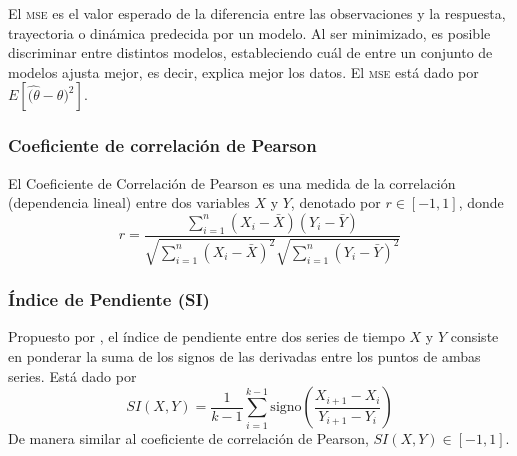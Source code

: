 El \textsc{mse} \citep{msewiki} es el valor esperado de la diferencia entre las observaciones y la respuesta, trayectoria o dinámica predecida por un modelo. Al ser minimizado, es posible discriminar entre distintos modelos, estableciendo cuál de entre un conjunto de modelos ajusta mejor, es decir, explica mejor los datos. El \textsc{mse} está dado por $E[\hat{(\theta} - \theta)^2]$.

\subsubsection{Coeficiente de correlación de Pearson}

El Coeficiente de Correlación de Pearson \citep{pearsoncorrwiki} es una medida de la correlación (dependencia lineal) entre dos variables $X$ y $Y$, denotado por $r \in [-1, 1]$, donde
\begin{equation} 
r = \frac{\sum_{i=1}^n (X_i - \bar{X})(Y_i - \bar{Y})} {\sqrt{\sum_{i=1}^n (X_i - \bar{X})^2} \sqrt{\sum_{i=1}^n (Y_i - \bar{Y})^2}}
\end{equation}

\subsubsection{Índice de Pendiente (SI)}

Propuesto por \citeauthor{Cho2006} \citep{Cho2006}, el índice de pendiente entre dos series de tiempo $X$ y $Y$ consiste en ponderar la suma de los signos de las derivadas entre los puntos de ambas series. Está dado por 
\begin{equation}
SI(X,Y) = \frac{1}{k - 1} \sum_{i=1}^{k-1} \mathrm{signo} \left(\frac{X_{i+1} - X_i} {Y_{i+1} - Y_i}\right)
\end{equation}
De manera similar al coeficiente de correlación de Pearson, $SI(X,Y)\in [-1, 1]$. 

